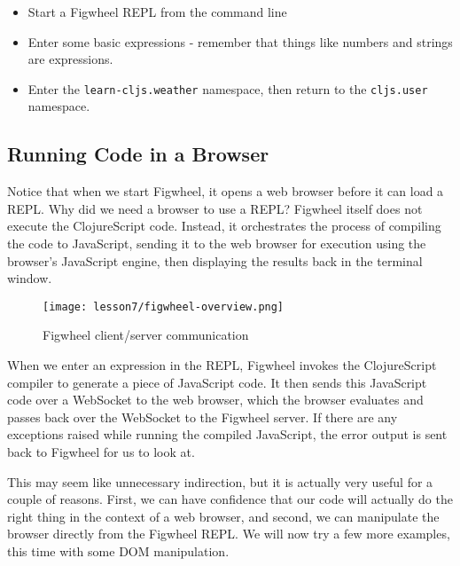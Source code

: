 \documentclass[10pt,twoside,openright]{memoir}
\begin{document}
\begin{itemize}
\tightlist
\item
  Start a Figwheel REPL from the command line
\item
  Enter some basic expressions - remember that things like numbers and
  strings are expressions.
\item
  Enter the \texttt{learn-cljs.weather} namespace, then return to the
  \texttt{cljs.user} namespace.
\end{itemize}

\subsection{Running Code in a Browser}

Notice that when we start Figwheel, it opens a web browser before it can
load a REPL. Why did we need a browser to use a REPL? Figwheel itself
does not execute the ClojureScript code. Instead, it orchestrates the
process of compiling the code to JavaScript, sending it to the web
browser for execution using the browser's JavaScript engine, then
displaying the results back in the terminal window.

\begin{figure}[H]
\caption{Figwheel client/server communication}
\centering
\texttt{[image: lesson7/figwheel-overview.png]}
\end{figure}

When we enter an expression in the REPL, Figwheel invokes the
ClojureScript compiler to generate a piece of JavaScript code. It then
sends this JavaScript code over a WebSocket to the web browser, which
the browser evaluates and passes back over the WebSocket to the Figwheel
server. If there are any exceptions raised while running the compiled
JavaScript, the error output is sent back to Figwheel for us to look at.

This may seem like unnecessary indirection, but it is actually very
useful for a couple of reasons. First, we can have confidence that our
code will actually do the right thing in the context of a web browser,
and second, we can manipulate the browser directly from the Figwheel
REPL. We will now try a few more examples, this time with some DOM
manipulation.
\end{document}
